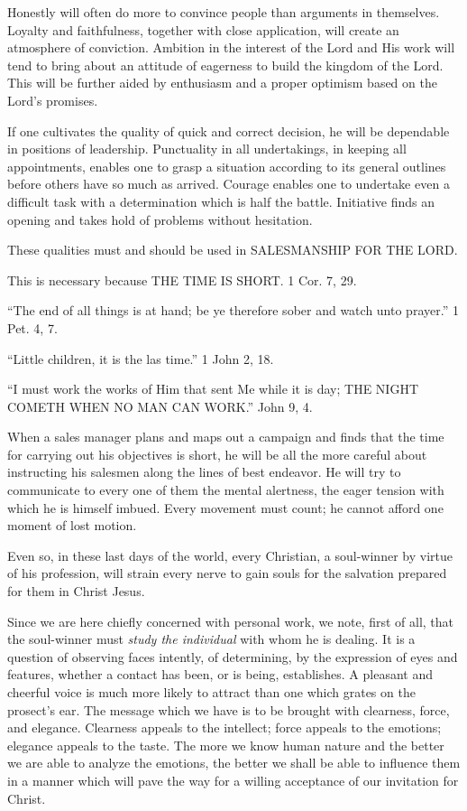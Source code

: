 \documentclass[
]{book}
\begin{document}
Honestly will often do more to convince people than arguments in themselves. Loyalty and faithfulness, together with close application, will create an atmosphere of conviction. Ambition in the interest of the Lord and His work will tend to bring about an attitude of eagerness to build the kingdom of the Lord. This will be further aided by enthusiasm and a proper optimism based on the Lord's promises.

If one cultivates the quality of quick and correct decision, he will be dependable in positions of leadership. Punctuality in all undertakings, in keeping all appointments, enables one to grasp a situation according to its general outlines before others have so much as arrived. Courage enables one to undertake even a difficult task with a determination which is half the battle. Initiative finds an opening and takes hold of problems without hesitation.

These qualities must and should be used in SALESMANSHIP FOR THE LORD.

This is necessary because THE TIME IS SHORT. 1 Cor. 7, 29.

``The end of all things is at hand; be ye therefore sober and watch unto prayer.'' 1 Pet. 4, 7.

``Little children, it is the las time.'' 1 John 2, 18.

``I must work the works of Him that sent Me while it is day; THE NIGHT COMETH WHEN NO MAN CAN WORK.'' John 9, 4.

When a sales manager plans and maps out a campaign and finds that the time for carrying out his objectives is short, he will be all the more careful about instructing his salesmen along the lines of best endeavor. He will try to communicate to every one of them the mental alertness, the eager tension with which he is himself imbued. Every movement must count; he cannot afford one moment of lost motion.

Even so, in these last days of the world, every Christian, a soul-winner by virtue of his profession, will strain every nerve to gain souls for the salvation prepared for them in Christ Jesus.

Since we are here chiefly concerned with personal work, we note, first of all, that the soul-winner must \emph{study the individual} with whom he is dealing. It is a question of observing faces intently, of determining, by the expression of eyes and features, whether a contact has been, or is being, establishes. A pleasant and cheerful voice is much more likely to attract than one which grates on the prosect's ear. The message which we have is to be brought with clearness, force, and elegance. Clearness appeals to the intellect; force appeals to the emotions; elegance appeals to the taste. The more we know human nature and the better we are able to analyze the emotions, the better we shall be able to influence them in a manner which will pave the way for a willing acceptance of our invitation for Christ.
\end{document}
